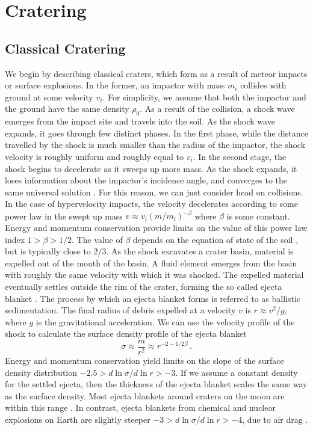 \documentclass[usenatbib]{mnras}
\begin{document}
\section{Cratering} \label{sec:cratering}

\subsection{Classical Cratering}

We begin by describing classical craters, which form as a result of meteor impacts or surface explosions. In the former, an impactor with mass $m_i$ collides with ground at some velocity $v_i$. For simplicity, we assume that both the impactor and the ground have the same density $\rho_0$. As a result of the collision, a shock wave emerges from the impact site and travels into the soil. As the shock wave expands, it goes through few distinct phases. In the first phase, while the distance travelled by the shock is much smaller than the radius of the impactor, the shock velocity is roughly uniform and roughly equal to $v_i$. In the second stage, the shock begins to decelerate as it sweeps up more mass. As the shock expands, it loses information about the impactor's incidence angle, and converges to the same universal solution \citep{Yalinewich2020SelfCollisions}. For this reason, we can just consider head on  collisions. In the case of hypervelocity impacts, the velocity decelerates according to some power law in the swept up mass $v \approx v_i \left(m/m_i\right)^{-\beta}$ where $\beta$ is some constant. Energy and momentum conservation provide limits on the value of this power law index \citep{Zeldovich1956ThePressure} $1>\beta>1/2$. The value of $\beta$ depends on the equation of state of the soil \citep{Housen1983CraterAnalysis., Yalinewich2020SelfCollisions}, but is typically close to 2/3. As the shock excavates a crater basin, material is expelled out of the mouth of the basin. A fluid element emerges from the basin with roughly the same velocity with which it was shocked. The expelled material eventually settles outside the rim of the crater, forming the so called ejecta blanket \citep{Osinski2011ImpactPlanets}. The process by which an ejecta blanket forms is referred to as ballistic sedimentation. The final radius of debris expelled at a velocity $v$ is $r \approx v^2/g$, where $g$ is the gravitational acceleration. We can use the velocity profile of the shock to calculate the surface density profile of the ejecta blanket
\begin{equation}
    \sigma \approx \frac{m}{r^2} \approx r^{-2-1/2\beta} \, .
\end{equation}
Energy and momentum conservation yield limits on the slope of the surface density distribution $-2.5>d \ln \sigma / d \ln r>-3$. If we assume a constant density for the settled ejecta, then the thickness of the ejecta blanket scales the same way as the surface density. Most ejecta blankets around craters on the moon are within this range \citep{Zhu2015NumericalMoon, Zhu2017EffectsDistribution, Raggio2016ADVANCEMENTSCRATERS}. In contrast, ejecta blankets from chemical and nuclear explosions on Earth are slightly steeper $-3>d \ln \sigma / d \ln r>-4$, due to air drag \citep{Carlson1965DistributionSoils}.
\end{document}
